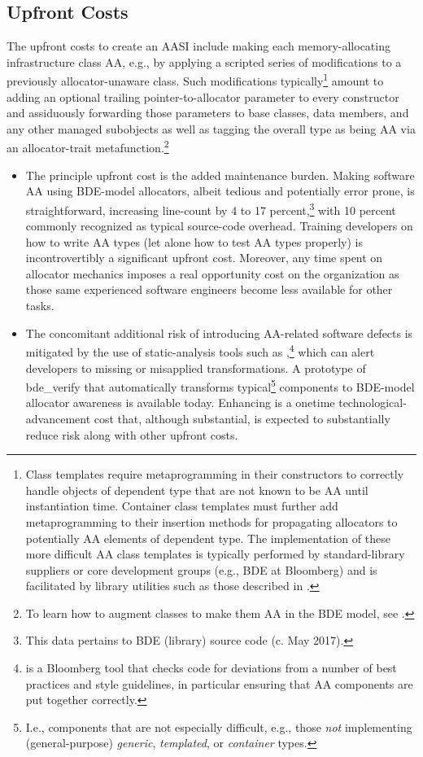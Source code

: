 \subsection{Upfront Costs}
The upfront costs to create an AASI include making each memory-allocating
infrastructure class AA, e.g., by applying a scripted series of modifications to a
previously allocator-unaware class. Such modifications typically\footnote{Class templates require metaprogramming in their constructors to correctly handle objects of
dependent type that are not known to be AA until instantiation time. Container class templates must
further add metaprogramming to their insertion methods for propagating allocators to potentially AA
elements of dependent type. The implementation of these more difficult AA class templates is typically
performed by standard-library suppliers or core development groups (e.g., BDE at Bloomberg) and is
facilitated by library utilities such as those described in \cite{halpern18}.} amount to adding
an optional trailing pointer-to-allocator parameter to every constructor and
assiduously forwarding those parameters to base classes, data members, and any
other managed subobjects as well as tagging the overall type as being AA via an
allocator-trait metafunction.\footnote{To learn how to augment classes to make them AA in the BDE model, see \cite{halpern20b}.}

\begin{itemize}

\item The principle upfront cost is the added maintenance burden. Making software
AA using BDE-model allocators, albeit tedious and potentially error prone, is
straightforward, increasing line-count by 4 to 17 percent,\footnote{This
data pertains to BDE (library) source code (c. May 2017). } with 10 percent
commonly recognized as typical source-code overhead. Training developers on
how to write AA types (let alone how to test AA types properly) is
incontrovertibly a significant upfront cost. Moreover, any time spent on
allocator mechanics imposes a real opportunity cost on the organization as
those same experienced software engineers become less available for other
tasks.

\item The concomitant additional risk of introducing AA-related software defects is
mitigated by the use of static-analysis tools such as ,\footnote{ is a
Bloomberg tool that checks code for deviations from a number of best practices
and style guidelines, in particular ensuring that AA components are put together
correctly.} which can
alert developers to missing or misapplied transformations. A prototype of
bde_verify that automatically transforms typical\footnote{I.e., components that
are not especially difficult, e.g., those \emph{not} implementing (general-purpose)
\emph{generic}, \emph{templated}, or \emph{container} types.} components to BDE-model 
allocator awareness is available today. Enhancing  is a onetime
technological-advancement cost that, although substantial, is expected
to substantially reduce risk along with other upfront costs.

\end{itemize}

